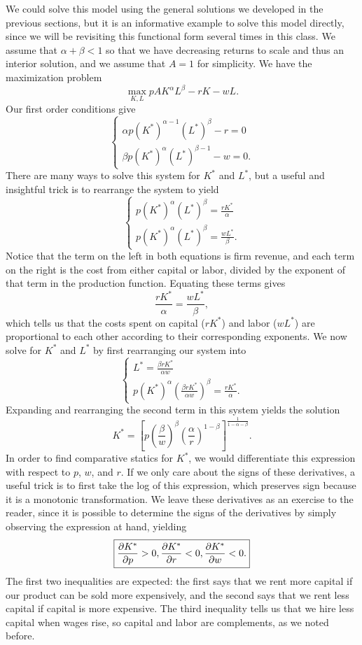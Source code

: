 We could solve this model using the general solutions we developed in the previous sections, but it is an informative example to solve this model directly, since we will be revisiting this functional form several times in this class. We assume that $\alpha + \beta < 1$ so that we have decreasing returns to scale and thus an interior solution, and we assume that $A = 1$ for simplicity. We have the maximization problem
$$\max_{K, L} pAK^\alpha L^\beta - rK - wL.$$
Our first order conditions give
$$\begin{cases}
\alpha p (K^*)^{\alpha - 1} (L^*)^{\beta} - r = 0 \\
\beta p (K^*)^{\alpha} (L^*)^{\beta - 1} - w = 0.
\end{cases}$$
There are many ways to solve this system for $K^*$ and $L^*$, but a useful and insightful trick is to rearrange the system to yield
$$\begin{cases}
p (K^*)^{\alpha} (L^*)^{\beta} = \frac{rK^*}{\alpha} \\
p (K^*)^{\alpha} (L^*)^{\beta }  = \frac{wL^*}{\beta}.
\end{cases}$$
Notice that the term on the left in both equations is firm revenue, and each term on the right is the cost from either capital or labor, divided by the exponent of that term in the production function. Equating these terms gives 
$$\frac{rK^*}{\alpha} = \frac{wL^*}{\beta},$$
which tells us that the costs spent on capital ($rK^*$) and labor ($wL^*$) are proportional to each other according to their corresponding exponents.
We now solve for $K^*$ and $L^*$ by first rearranging our system into
$$\begin{cases}
L^* = \frac{\beta r K^*}{\alpha w} \\
p (K^*)^{\alpha} (\frac{\beta r K^*}{\alpha w})^{\beta }  = \frac{rK^*}{\alpha}.
\end{cases}$$
Expanding and rearranging the second term in this system yields the solution
$$\boxed{K^* = \left[p\left(\frac{\beta}{w}\right)^{\beta} \left(\frac{\alpha}{r}\right)^{1-\beta} \right]^{\frac{1}{1-\alpha-\beta}}.}$$
In order to find comparative statics for $K^*$, we would differentiate this expression with respect to $p$, $w$, and $r$. If we only care about the signs of these derivatives, a useful trick is to first take the log of this expression, which preserves sign because it is a monotonic transformation. We leave these derivatives as an exercise to the reader, since it is possible to determine the signs of the derivatives by simply observing the expression at hand, yielding
$$\boxed{\pdv{K^*}{p}>0, \pdv{K^*}{r}<0, \pdv{K^*}{w}<0.}$$
The first two inequalities are expected: the first says that we rent more capital if our product can be sold more expensively, and the second says that we rent less capital if capital is more expensive. The third inequality tells us that we hire less capital when wages rise, so capital and labor are complements, as we noted before.

